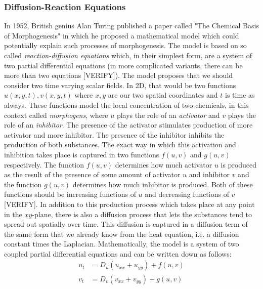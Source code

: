 \subsubsection{Diffusion-Reaction Equations} In 1952, British genius Alan Turing published a paper called "The Chemical Basis of Morphogenesis" in which he proposed a mathematical model which could potentially explain such processes of morphogenesis. The model is based on so called \emph{reaction-diffusion equations} which, in their simplest form, are a system of two partial differential equations (in more complicated variants, there can be more than two equations [VERIFY]). The model proposes that we should consider two time varying scalar fields. In 2D, that would be two functions $u(x,y,t), v(x,y,t)$ where $x,y$ are our two spatial coordinates and $t$ is time as always. These functions model the local concentration of two chemicals, in this context called \emph{morphogens}, where $u$ plays the role of an \emph{activator} and $v$ plays the role of an \emph{inhibitor}. The presence of the activator stimulates production of more activator and more inhibitor. The presence of the inhibitor inhibits the production of both substances. The exact way in which this activation and inhibition takes place is captured in two functions $f(u,v)$ and $g(u,v)$ respectively. The function $f(u,v)$ determines how much activator $u$ is produced as the result of the presence of some amount of activator $u$ and inhibitor $v$ and the function $g(u,v)$ determines how much inhibitor is produced. Both of these functions should be increasing functions of $u$ and decreasing functions of $v$ [VERIFY]. In addition to this production process which takes place at any point in the $xy$-plane, there is also a diffusion process that lets the substances tend to spread out spatially over time. This diffusion is captured in a diffusion term of the same form that we already know from the heat equation, i.e. a diffusion constant times the Laplacian. Mathematically, the model is a system of two coupled partial differential equations and can be written down as follows:
\begin{eqnarray}
u_t &= D_u (u_{xx} + u_{yy}) + f(u,v)  \\
v_t &= D_v (v_{xx} + v_{yy}) + g(u,v) 
\end{eqnarray}




